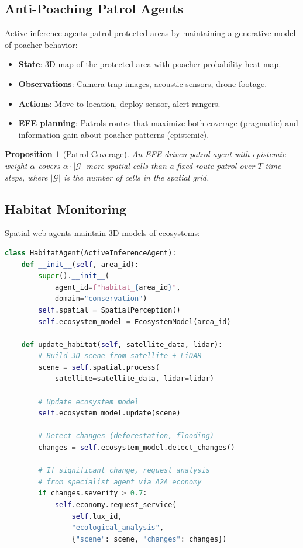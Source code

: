 \documentclass[11pt,letterpaper]{article}
\newtheorem{proposition}[theorem]{Proposition}
\begin{document}
\subsection{Anti-Poaching Patrol Agents}

Active inference agents patrol protected areas by maintaining a generative model of poacher behavior:

\begin{itemize}
    \item \textbf{State}: 3D map of the protected area with poacher probability heat map.
    \item \textbf{Observations}: Camera trap images, acoustic sensors, drone footage.
    \item \textbf{Actions}: Move to location, deploy sensor, alert rangers.
    \item \textbf{EFE planning}: Patrols routes that maximize both coverage (pragmatic) and information gain about poacher patterns (epistemic).
\end{itemize}

\begin{proposition}[Patrol Coverage]
An EFE-driven patrol agent with epistemic weight $\alpha$ covers $\alpha \cdot |\mathcal{G}|$ more spatial cells than a fixed-route patrol over $T$ time steps, where $|\mathcal{G}|$ is the number of cells in the spatial grid.
\end{proposition}

\subsection{Habitat Monitoring}

Spatial web agents maintain 3D models of ecosystems:

\begin{lstlisting}[language=Python,caption=Habitat monitoring agent]
class HabitatAgent(ActiveInferenceAgent):
    def __init__(self, area_id):
        super().__init__(
            agent_id=f"habitat_{area_id}",
            domain="conservation")
        self.spatial = SpatialPerception()
        self.ecosystem_model = EcosystemModel(area_id)

    def update_habitat(self, satellite_data, lidar):
        # Build 3D scene from satellite + LiDAR
        scene = self.spatial.process(
            satellite=satellite_data, lidar=lidar)

        # Update ecosystem model
        self.ecosystem_model.update(scene)

        # Detect changes (deforestation, flooding)
        changes = self.ecosystem_model.detect_changes()

        # If significant change, request analysis
        # from specialist agent via A2A economy
        if changes.severity > 0.7:
            self.economy.request_service(
                self.lux_id,
                "ecological_analysis",
                {"scene": scene, "changes": changes})
\end{lstlisting}
\end{document}

